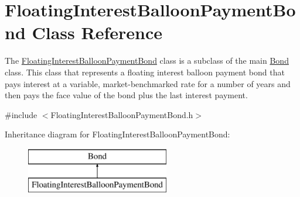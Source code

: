 \hypertarget{classFloatingInterestBalloonPaymentBond}{}\section{Floating\+Interest\+Balloon\+Payment\+Bond Class Reference}
\label{classFloatingInterestBalloonPaymentBond}


The {\ttfamily \mbox{\hyperlink{classFloatingInterestBalloonPaymentBond}{Floating\+Interest\+Balloon\+Payment\+Bond}}} class is a subclass of the main {\ttfamily \mbox{\hyperlink{classBond}{Bond}}} class. This class that represents a floating interest balloon payment bond that pays interest at a variable, market-\/benchmarked rate for a number of years and then pays the face value of the bond plus the last interest payment.  




{\ttfamily \#include $<$Floating\+Interest\+Balloon\+Payment\+Bond.\+h$>$}

Inheritance diagram for Floating\+Interest\+Balloon\+Payment\+Bond\+:\begin{figure}[H]
\begin{center}
\leavevmode
\includegraphics[height=2.000000cm]{classFloatingInterestBalloonPaymentBond}
\end{center}
\end{figure}
